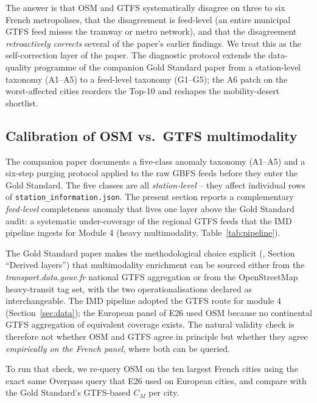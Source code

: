 \documentclass[11pt,a4paper]{article}
\begin{document}
The answer is that OSM and GTFS systematically disagree on three
to six French metropolises, that the disagreement is feed-level
(an entire municipal GTFS feed misses the tramway or metro
network), and that the disagreement \emph{retroactively corrects}
several of the paper's earlier findings. We treat this as the
self-correction layer of the paper. The diagnostic protocol
extends the data-quality programme of the companion Gold Standard
paper \citep{Fosse2026gold} from a station-level taxonomy
(A1--A5) to a feed-level taxonomy (G1--G5); the A6 patch on the
worst-affected cities reorders the Top-10 and reshapes the
mobility-desert shortlist.

\subsection{Calibration of OSM vs.\ GTFS multimodality}
\label{sec:val-osm-gtfs}

The companion \citet{Fosse2026gold} paper documents a five-class
anomaly taxonomy (A1--A5) and a six-step purging protocol applied
to the raw GBFS feeds before they enter the Gold Standard. The
five classes are all \emph{station-level} -- they affect
individual rows of \texttt{station\_information.json}. The
present section reports a complementary \emph{feed-level}
completeness anomaly that lives one layer above the Gold Standard
audit: a systematic under-coverage of the regional GTFS feeds
that the IMD pipeline ingests for Module 4 (heavy multimodality,
Table~\ref{tab:pipeline}).

The Gold Standard paper makes the methodological choice
explicit (\cite{Fosse2026gold}, Section ``Derived layers'') that
multimodality enrichment can be sourced either from the
\emph{transport.data.gouv.fr} national GTFS aggregation or from
the OpenStreetMap heavy-transit tag set, with the two
operationalisations declared as interchangeable. The IMD pipeline
adopted the GTFS route for module 4 (Section~\ref{sec:data}); the
European panel of E26 used OSM because no continental GTFS
aggregation of equivalent coverage exists. The natural validity
check is therefore not whether OSM and GTFS agree in principle
but whether they agree \emph{empirically on the French panel},
where both can be queried.

To run that check, we re-query OSM on the ten largest French
cities using the exact same Overpass query that E26 used on
European cities, and compare with the Gold Standard's GTFS-based
$C_M$ per city.
\end{document}
